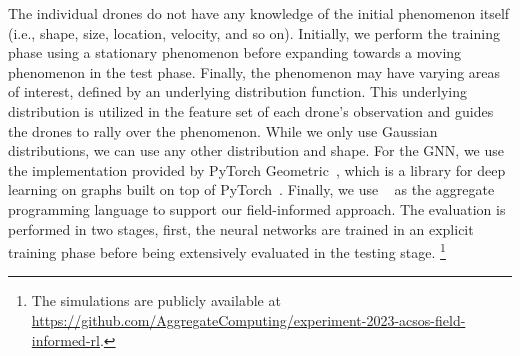  The individual drones do not have any knowledge of the initial phenomenon itself (i.e., shape, size, location, velocity, and so on).
Initially, 
  we perform the training phase using a stationary phenomenon before expanding towards a moving phenomenon in the test phase. 
  Finally, the phenomenon may have varying areas of interest, defined by an underlying distribution function. 
  This underlying distribution is utilized in the feature set of each drone's observation and guides the drones to rally over the phenomenon. 
  While we only use Gaussian distributions, we can use any other distribution and shape. 
For the \ac{GNN}, we use the implementation provided by PyTorch Geometric~\cite{DBLP:journals/corr/abs-1903-02428}, 
 which is a library for deep learning on graphs built on top of PyTorch~\cite{torch}.
Finally, we use \scafi{}~\cite{casadei2022scafi} as the aggregate programming language to support our field-informed approach.
%
The evaluation is performed in two stages, 
 first, the neural networks are trained in an explicit training phase before being extensively evaluated in the testing stage.
\footnote{The simulations are publicly available at \url{https://github.com/AggregateComputing/experiment-2023-acsos-field-informed-rl}.}
